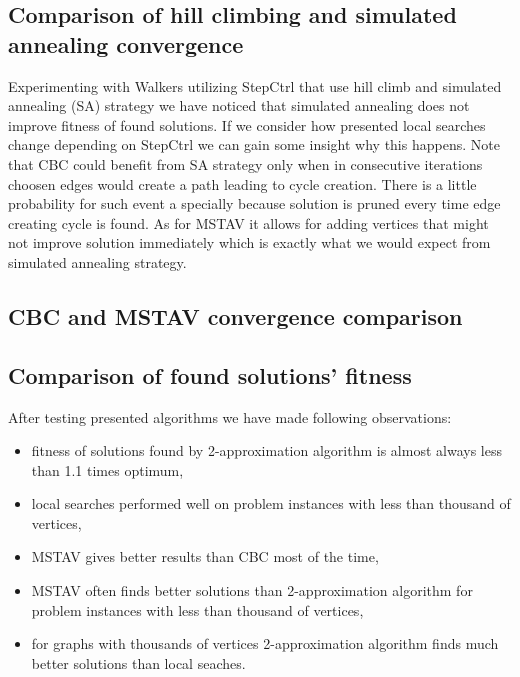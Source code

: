 \subsection{Comparison of hill climbing and simulated annealing convergence}
\FloatBarrier
Experimenting with Walkers utilizing StepCtrl that use hill climb and simulated annealing (SA) strategy we have noticed that simulated annealing does not improve fitness of found solutions.
If we consider how presented local searches change depending on StepCtrl we can gain some insight why this happens.
Note that CBC could benefit from SA strategy only when in consecutive iterations choosen edges would create a path leading to cycle creation. There is a little probability for such event a specially because solution is pruned every time edge creating cycle is found. As for MSTAV it allows for adding vertices that might not improve solution immediately which is exactly what we would expect from simulated annealing strategy.

\begin{figure}[hb]

\end{figure}
\begin{figure}[hb]

\end{figure}
\FloatBarrier

\subsection{CBC and MSTAV convergence comparison}
\FloatBarrier

\begin{figure}[hb]

\end{figure}
\FloatBarrier

\subsection{Comparison of found solutions' fitness}
\FloatBarrier
After testing presented algorithms we have made following observations:
\begin{itemize}
\item fitness of solutions found by 2-approximation algorithm is almost always less than 1.1 times optimum,
\item local searches performed well on problem instances with less than thousand of vertices,
\item MSTAV gives better results than CBC most of the time,
\item MSTAV often finds better solutions than 2-approximation algorithm for problem instances with less than thousand of vertices,
\item for graphs with thousands of vertices 2-approximation algorithm finds much better solutions than local seaches.
\end{itemize}

